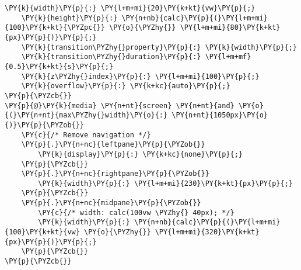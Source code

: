 \begin{Verbatim}[commandchars=\\\{\}]
    \PY{k}{width}\PY{p}{:} \PY{l+m+mi}{20}\PY{k+kt}{vw}\PY{p}{;}
    \PY{k}{height}\PY{p}{:} \PY{n+nb}{calc}\PY{p}{(}\PY{l+m+mi}{100}\PY{k+kt}{\PYZpc{}} \PY{o}{\PYZhy{}} \PY{l+m+mi}{80}\PY{k+kt}{px}\PY{p}{)}\PY{p}{;}
    \PY{k}{transition\PYZhy{}property}\PY{p}{:} \PY{k}{width}\PY{p}{;}
    \PY{k}{transition\PYZhy{}duration}\PY{p}{:} \PY{l+m+mf}{0.5}\PY{k+kt}{s}\PY{p}{;}
    \PY{k}{z\PYZhy{}index}\PY{p}{:} \PY{l+m+mi}{100}\PY{p}{;}
    \PY{k}{overflow}\PY{p}{:} \PY{k+kc}{auto}\PY{p}{;}
\PY{p}{\PYZcb{}}
\PY{p}{@}\PY{k}{media} \PY{n+nt}{screen} \PY{n+nt}{and} \PY{o}{(}\PY{n+nt}{max\PYZhy{}width}\PY{o}{:} \PY{n+nt}{1050px}\PY{o}{)}\PY{p}{\PYZob{}}
    \PY{c}{/* Remove navigation */}
    \PY{p}{.}\PY{n+nc}{leftpane}\PY{p}{\PYZob{}}
        \PY{k}{display}\PY{p}{:} \PY{k+kc}{none}\PY{p}{;}
    \PY{p}{\PYZcb{}}
    \PY{p}{.}\PY{n+nc}{rightpane}\PY{p}{\PYZob{}}
        \PY{k}{width}\PY{p}{:} \PY{l+m+mi}{230}\PY{k+kt}{px}\PY{p}{;}
    \PY{p}{\PYZcb{}}
    \PY{p}{.}\PY{n+nc}{midpane}\PY{p}{\PYZob{}}
        \PY{c}{/* width: calc(100vw \PYZhy{} 40px); */}
        \PY{k}{width}\PY{p}{:} \PY{n+nb}{calc}\PY{p}{(}\PY{l+m+mi}{100}\PY{k+kt}{vw} \PY{o}{\PYZhy{}} \PY{l+m+mi}{320}\PY{k+kt}{px}\PY{p}{)}\PY{p}{;}
    \PY{p}{\PYZcb{}}
\PY{p}{\PYZcb{}}
\end{Verbatim}
